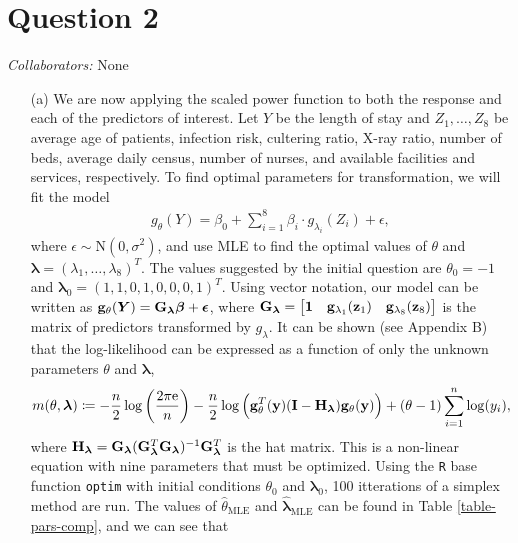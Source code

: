 \documentclass[10pt]{article}
\newcommand{\mycolaba}[1]{\textcolor{colabcol}{\textsl{Collaborators:}} #1}
\begin{document}
\section{Question 2} \noindent
\mycolaba{None}
\begin{itemize}
    \item[(a)] We are now applying the scaled power function to both the response and each of the predictors of interest. Let \(Y\) be the length of stay and 
    \(Z_1, \ldots, Z_8\) be average age of patients, infection risk, cultering ratio, X-ray ratio, number of beds, average daily census, number of nurses, and 
    available facilities and services, respectively. To find optimal parameters for transformation, we will fit the model 
    \begin{align}
        g_{\theta}(Y)
        = \beta_0 + \sum_{i = 1}^8 \beta_i \cdot g_{\lambda_{i}}(Z_i) + \epsilon,
        \label{model-senic-both}
    \end{align}
    where \(\epsilon \sim \mathrm{N}(0, \sigma^2)\), and use MLE to find the optimal values of \(\theta\) and \(\bm{\lambda} = (\lambda_1, \ldots, \lambda_8)^T\).
    The values suggested by the initial question are \(\theta_0 = -1\) and \(\bm{\lambda}_0 = (1,1,0,1,0,0,0,1)^T\).
    Using vector notation, our model can be written as \(\mathbf{g}_{\theta}(\bm{Y}) = \mathbf{G}_{\bm{\lambda}} \bm{\beta} + \bm{\epsilon}\), where 
    \(\mathbf{G}_{\bm{\lambda}} = \begin{bmatrix}
        \mathbf{1} & \mathbf{g}_{\lambda_1}(\mathbf{z}_1) & \mathbf{g}_{\lambda_8}(\mathbf{z}_8)
    \end{bmatrix}\)
    is the matrix of predictors transformed by \(g_{\lambda}\). It can be shown (see Appendix B) that the log-likelihood can be expressed as a function of only the
    unknown parameters \(\theta\) and \(\bm{\lambda}\), 
    \begin{align*}
        m(\theta, \bm{\lambda})
        \coloneqq - \frac{n}{2} \log \left( \frac{2 \pi \mathrm{e}}{n} \right) - \frac{n}{2} \log \Big( \mathbf{g}_{\theta}^T(\mathbf{y})(\mathbf{I} - \mathbf{H}_{\bm{\lambda}}) \mathbf{g}_{\theta}(\mathbf{y}) \Big) + (\theta - 1) \sum_{i=1}^n \log(y_i),
    \end{align*}
    where \(\mathbf{H}_{\bm{\lambda}} = \mathbf{G}_{\bm{\lambda}} (\mathbf{G}_{\bm{\lambda}}^T \mathbf{G}_{\bm{\lambda}})^{-1} \mathbf{G}_{\bm{\lambda}}^T\) is the hat matrix. This is a non-linear equation with nine parameters that must 
    be optimized.
    Using the \texttt{R} base function \texttt{optim} with initial conditions \(\theta_0\) and \(\bm{\lambda}_0\), 100 itterations of a simplex method are run.
    The values of \(\hat{\theta}_{\mathrm{MLE}}\) and \(\hat{\bm{\lambda}}_{\mathrm{MLE}}\) can be found in Table \ref{table-pars-comp}, and we can see that 

\end{itemize}
\end{document}
